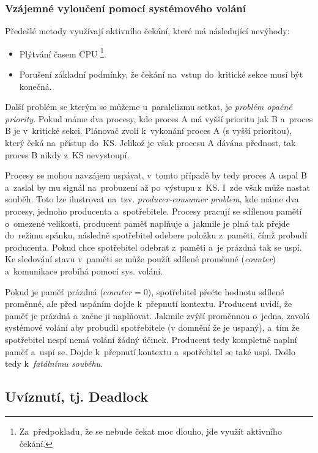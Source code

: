 \subsubsection{Vzájemné vyloučení pomocí systémového volání}

Předešlé metody využívají aktivního čekání, které má následující nevýhody:

\begin{itemize}[noitemsep]
	\item Plýtvání časem CPU%
	\footnote{Za~předpokladu, že se nebude čekat moc dlouho, jde využít aktivního čekání.}.
	\item Porušení základní podmínky, že čekání na~vstup do~kritické sekce musí být konečná.
\end{itemize}

Další problém se kterým se můžeme u~paralelizmu setkat, je \emph{problém opačné priority}. Pokud máme dva procesy, kde proces A má vyšší prioritu jak B a~proces B je v~kritické sekci. Plánovač zvolí k~vykonání proces A (s vyšší prioritou), který čeká na~přístup do~KS. Jelikož je však procesu A dávána přednost, tak proces B nikdy z~KS nevystoupí.

Procesy se mohou navzájem uspávat, v~tomto případě by tedy proces A uspal B a~zaslal by mu signál na~probuzení až po~výstupu z~KS. I~zde však může nastat souběh. Toto lze ilustrovat na~tzv. \emph{producer-consumer problem}, kde máme dva procesy, jednoho producenta a~spotřebitele. Procesy pracují se sdílenou pamětí o~omezené velikosti, producent paměť naplňuje a~jakmile je plná tak přejde do~režimu spánku, následně spotřebitel odebere položku z~paměti, čímž probudí producenta. Pokud chce spotřebitel odebrat z~paměti a~je prázdná tak se uspí. Ke sledování stavu v~paměti se může použít sdílené proměnné (\emph{counter}) a~komunikace probíhá pomocí sys. volání.

Pokud je paměť prázdná ($counter = 0$), spotřebitel přečte hodnotu sdílené proměnné, ale před uspáním dojde k~přepnutí kontextu. Producent uvidí, že paměť je prázdná a~začne ji naplňovat. Jakmile zvýší proměnnou o~jedna, zavolá systémové volání aby probudil spotřebitele (v domnění že je uspaný), a~tím že spotřebitel nespí nemá volání žádný účinek. Producent tedy kompletně naplní paměť a~uspí se. Dojde k~přepnutí kontextu a~spotřebitel se také uspí. Došlo tedy k~\emph{fatálnímu souběhu}.

\subsection{Uvíznutí, tj. Deadlock}

